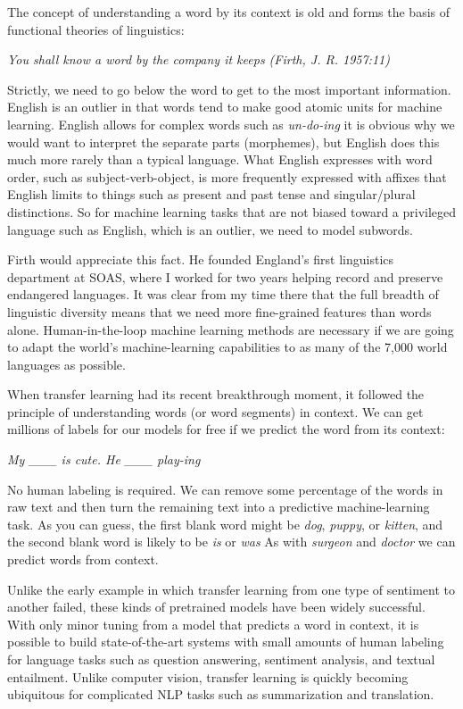 \documentclass[sigconf,nonacm,screen,pbalance]{acmart}
\begin{document}
The
concept of understanding a word by its context is old and forms the basis of functional
theories of linguistics:

{\em You shall know a word by the company it keeps (Firth, J. R. 1957:11)}

Strictly,
we need to go below the word to get to the most important information. English is an
outlier in that words tend to make good atomic units for machine learning. English
allows for complex words such as {\em un-do-ing} it is obvious why we would want to
interpret the separate parts (morphemes), but English does this much more rarely than a
typical language. What English expresses with word order, such as subject-verb-object,
is more frequently expressed with affixes that English limits to things such as present
and past tense and singular/plural distinctions. So for machine learning tasks that are
not biased toward a privileged language such as English, which is an outlier, we need to
model subwords.

Firth
would appreciate this fact. He founded England's first linguistics department at SOAS,
where I worked for two years helping record and preserve endangered languages. It was
clear from my time there that the full breadth of linguistic diversity means that we
need more fine-grained features than words alone. Human-in-the-loop machine learning
methods are necessary if we are going to adapt the world's machine-learning capabilities
to as many of the 7,000 world languages as possible.

When
transfer learning had its recent breakthrough moment, it followed the principle of
understanding words (or word segments) in context. We can get millions of labels for our
models for free if we predict the word from its context:

{\em My \_\_\_ is cute. He \_\_\_ play-ing}

No
human labeling is required. We can remove some percentage of the words in raw text and
then turn the remaining text into a predictive machine-learning task. As you can guess,
the first blank word might be {\em dog}, {\em puppy}, or {\em kitten}, and the second
blank word is likely to be {\em is} or {\em was} As with {\em surgeon} and
{\em doctor} we can predict words from context.

Unlike
the early example in which transfer learning from one type of sentiment to another
failed, these kinds of pretrained models have been widely successful. With only minor
tuning from a model that predicts a word in context, it is possible to build
state-of-the-art systems with small amounts of human labeling for language tasks such as
question answering, sentiment analysis, and textual entailment. Unlike computer vision,
transfer learning is quickly becoming ubiquitous for complicated NLP tasks such as
summarization and translation.
\end{document}
